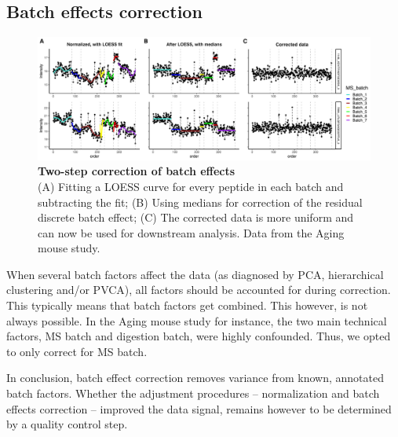 \documentclass[num-refs]{wiley-article}
\begin{document}
\subsection{Batch effects correction}
\begin{figure}[hbt]
	\includegraphics[width=\textwidth]{figures/Fig5_batch_correction1.pdf}
	
	\caption{\textbf{Two-step correction of batch effects}  \\
		\footnotesize
		(A) Fitting a LOESS curve for every peptide in each batch and subtracting the fit; (B) Using medians for correction of the residual discrete batch effect; (C) The corrected data is more uniform and can now be used for downstream analysis. Data from the Aging mouse study.}
	\label{fig:batch_fig5_batchCorrection}
\end{figure}

When several batch factors affect the data (as diagnosed by PCA, hierarchical clustering and/or PVCA), all factors should be accounted for during correction. This typically means that batch factors get combined. This however, is not always possible. In the Aging mouse study for instance, the two main technical factors, MS batch and digestion batch, were highly confounded. Thus, we opted to only correct for MS batch.

In conclusion, batch effect correction removes variance from known, annotated batch factors. Whether the adjustment procedures – normalization and batch effects correction – improved the data signal, remains however to be determined by a quality control step.
\end{document}
